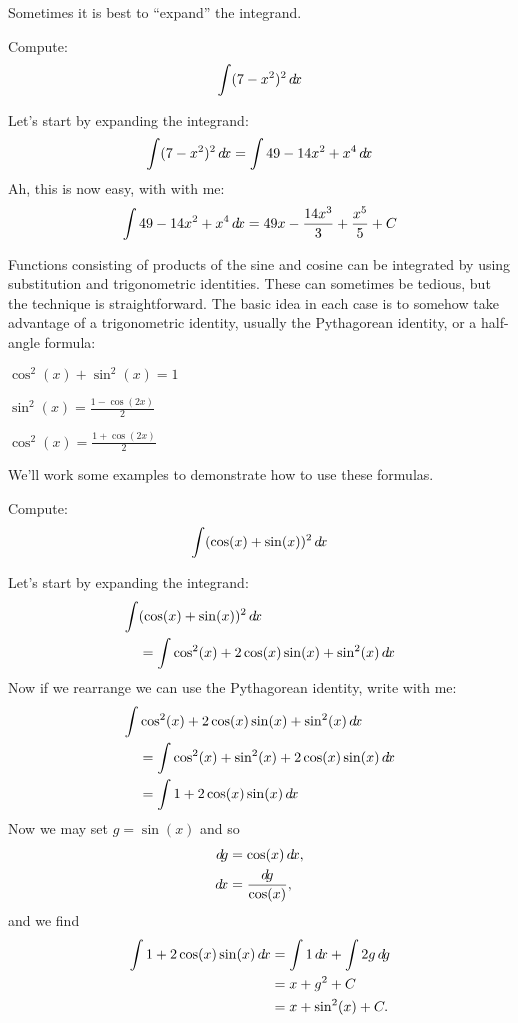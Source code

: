 \documentclass{ximera}
\begin{document}
Sometimes it is best to ``expand'' the integrand.

\begin{example}
  Compute:
  \[
  \int (7-x^2)^2 \mathop{}\!d\! x
  \]
  \begin{explanation}
    Let's start by expanding the integrand:
    \[
    \int (7-x^2)^2 \mathop{}\!d\! x  = \int 49 - 14x^2 + x^4 \mathop{}\!d\! x
    \]
    Ah, this is now easy, with with me:
    \[
    \int 49 - 14x^2 + x^4 \mathop{}\!d\! x = 49x - \frac{14 x^3}{3} + \frac{x^5}{5}+ C
    \]
  \end{explanation}
\end{example}

Functions consisting of products of the sine and cosine can be
integrated by using substitution and trigonometric identities. These
can sometimes be tedious, but the technique is straightforward. The
basic idea in each case is to somehow take advantage of a
trigonometric identity, usually the Pythagorean identity, or a
half-angle formula:
\begin{description}
\item[Pythagorean Identity] $\cos^2(x) + \sin^2(x) = 1$
\item[Half-Angle Formula] $\sin^2(x) = \frac{1-\cos(2x)}{2}$
\item[Half-Angle Formula] $\cos^2(x)= \frac{1+\cos(2x)}{2}$
\end{description}

We'll work some examples to demonstrate how to use these formulas.

\begin{example}
  Compute:
  \[
  \int (\cos(x)+\sin(x))^2\mathop{}\!d\! x
  \]
  \begin{explanation}
    Let's start by expanding the integrand:
    \begin{align*}
      \int &(\cos(x)+\sin(x))^2 \mathop{}\!d\! x\\
      &= \int \cos^2(x) + 2\cos(x)\sin(x) + \sin^2(x) \mathop{}\!d\! x
    \end{align*}
    Now if we rearrange we can use the Pythagorean identity, write with me:
    \begin{align*}
      \int &\cos^2(x) + 2\cos(x)\sin(x) + \sin^2(x) \mathop{}\!d\! x \\
      &= \int \cos^2(x) + \sin^2(x) + 2\cos(x)\sin(x) \mathop{}\!d\! x\\
      &= \int 1 + 2\cos(x)\sin(x) \mathop{}\!d\! x
    \end{align*}
    Now we may set $g = \sin(x)$ and so
    \begin{align*}
      \d g &= \cos(x) \d x,\\
      \d x & = \frac{\d g}{\cos(x)},
    \end{align*}
    and we find
    \begin{align*}
      \int 1 + 2\cos(x)\sin(x) \mathop{}\!d\! x &= \int 1 \mathop{}\!d\! x + \int 2g \mathop{}\!d\! g\\
      &= x + g^2 + C\\
      &= x + \sin^2(x)+C.
    \end{align*}
  \end{explanation}
\end{example}
\end{document}
